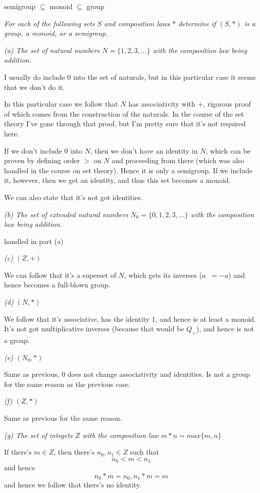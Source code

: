 \documentclass[11pt,oneside,titlepage]{book}
\DeclareMathOperator \inv {^{-1}}
\newcommand{\set}[1]{\{ #1 \}}
\begin{document}
semigroup $\subseteq$ monoid $\subseteq$ group

\textit{For each of the following sets $S$ and composition laws $*$
determine if $(S, *)$ is a group, a monoid, or a semigroup.}

\textit{(a) The set of natural numbers $N = \set{1, 2, 3, ...}$ with
the composition law being addition.}

I usually do include $0$ into the set of naturals, but in this
particular case it seems that we don't do it.

In this particular case we follow that $N$ has associativity with $+$,
rigorous proof of which comes from the construction of the naturals.
In the course of the set theory I've gone through that proof, but I'm
pretty sure that it's not required here.

If we don't include $0$ into $N$, then we don't have an identity in
$N$, which can be proven by defining order $>$ on $N$ and proceeding
from there (which was also handled in the course on set theory).
Hence it is only a semigroup. If we include it, however, then we get
an identity, and thus this set becomes a monoid.

We can also state that it's not got identities.

\textit{(b) The set of extended natural numbers $N_0 = \set{0, 1, 2,
3, ...}$ with the composition law being addition.}

handled in part (a)

\textit{(c) $(Z, +)$}

We can follow that it's a superset of $N$, which gets its inverses
($a\inv = -a$) and hence becomes a full-blown group.

\textit{(d) $(N, *)$}

We follow that it's associative, has the identity $1$, and hence is at
least a monoid. It's not got multiplicative inverses (because that
would be $Q_+$), and hence is not a group.

\textit{(e) $(N_0, *)$}

Same as previous, $0$ does not change associativity and identities. Is
not a group for the same reason as the previous case.

\textit{(f) $(Z, *)$}

Same as previous for the same reason.

\textit{(g) The set of integets $Z$ with the composition law $m * n =
max\set{m, n}$}

If there's $m \in Z$, then there's $n_0, n_1 \in Z$ such that
$$n_0 < m < n_1$$
and hence
$$n_0 * m = n_0, n_1 * m = m$$
and hence we follow that there's no identity.
\end{document}
